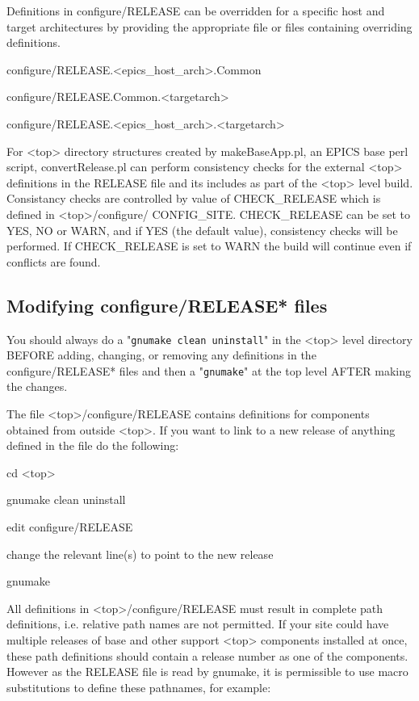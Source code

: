 Definitions in configure/RELEASE can be overridden for a specific host and target architectures by providing the 
appropriate file or files containing overriding definitions.

configure/RELEASE.\textless{}epics\_host\_arch\textgreater{}.Common

configure/RELEASE.Common.\textless{}targetarch\textgreater{}

configure/RELEASE.\textless{}epics\_host\_arch\textgreater{}.\textless{}targetarch\textgreater{}

For \textless{}top\textgreater{} directory structures created by makeBaseApp.pl, an EPICS base perl script, convertRelease.pl can perform 
consistency checks for the external \textless{}top\textgreater{} definitions in the RELEASE file and its includes as part of the \textless{}top\textgreater{} level 
build. Consistancy checks are controlled by value of CHECK\_RELEASE which is defined in \textless{}top\textgreater{}/configure/
CONFIG\_SITE. CHECK\_RELEASE can be set to YES, NO or WARN, and if YES (the default value), consistency 
checks will be performed. If CHECK\_RELEASE is set to WARN the build will continue even if conflicts are found.

\subsection{Modifying configure/RELEASE* files}

You should always do a "\verb|gnumake clean uninstall|" in the \textless{}top\textgreater{} level directory BEFORE adding, changing, or 
removing any definitions in the configure/RELEASE* files and then a "\verb|gnumake|" at the top level AFTER making the 
changes.

The file \textless{}top\textgreater{}/configure/RELEASE contains definitions for components obtained from outside \textless{}top\textgreater{}. If you want to link 
to a new release of anything defined in the file do the following:

cd \textless{}top\textgreater{}

gnumake clean uninstall

edit configure/RELEASE

change the relevant line(s) to point to the new release

gnumake

All definitions in \textless{}top\textgreater{}/configure/RELEASE must result in complete path definitions, i.e. relative path names are not 
permitted. If your site could have multiple releases of base and other support \textless{}top\textgreater{} components installed at once, these 
path definitions should contain a release number as one of the components. However as the RELEASE file is read by 
gnumake, it is permissible to use macro substitutions to define these pathnames, for example:

